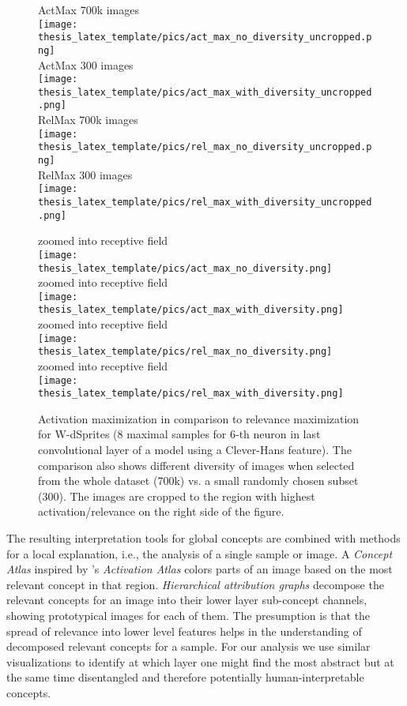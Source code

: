 \begin{figure}[t!]
\centering
\begin{minipage}{0.48\textwidth}
    ActMax 700k images \\
	\texttt{[image: thesis\_latex\_template/pics/act\_max\_no\_diversity\_uncropped.png]}\\
    ActMax 300 images \\
	\texttt{[image: thesis\_latex\_template/pics/act\_max\_with\_diversity\_uncropped.png]}\\
    RelMax 700k images\\
	\texttt{[image: thesis\_latex\_template/pics/rel\_max\_no\_diversity\_uncropped.png]}\\
    RelMax 300 images \\
	\texttt{[image: thesis\_latex\_template/pics/rel\_max\_with\_diversity\_uncropped.png]}
\end{minipage}
\begin{minipage}{0.48\textwidth}
    zoomed into receptive field \\
	\texttt{[image: thesis\_latex\_template/pics/act\_max\_no\_diversity.png]}\\
    zoomed into receptive field \\
	\texttt{[image: thesis\_latex\_template/pics/act\_max\_with\_diversity.png]}\\
    zoomed into receptive field \\
	\texttt{[image: thesis\_latex\_template/pics/rel\_max\_no\_diversity.png]}\\
    zoomed into receptive field \\
	\texttt{[image: thesis\_latex\_template/pics/rel\_max\_with\_diversity.png]}
\end{minipage}
\caption[ActMax vs. RelMax]{Activation maximization in comparison to relevance maximization for W-dSprites (8 maximal samples for 6-th neuron in last convolutional layer of a model using a Clever-Hans feature). The comparison also shows different diversity of images when selected from the whole dataset (700k) vs. a small randomly chosen subset (300). 
The images are cropped to the region with highest activation/relevance on the right side of the figure. }
\label{fig:act_rel_max}
\end{figure}

The resulting interpretation tools for global concepts are combined with methods for a local explanation, i.e., the analysis of a single sample or image. A \textit{Concept Atlas} inspired by \cite{Carter2019}'s \textit{Activation Atlas} colors parts of an image based on the most relevant concept in that region. \textit{Hierarchical attribution graphs} decompose the relevant concepts for an image into their lower layer sub-concept channels, showing prototypical images for each of them. The presumption is that the spread of relevance into lower level features helps in the understanding of decomposed relevant concepts for a sample. For our analysis we use similar visualizations to identify at which layer one might find the most abstract but at the same time disentangled and therefore potentially human-interpretable concepts.

